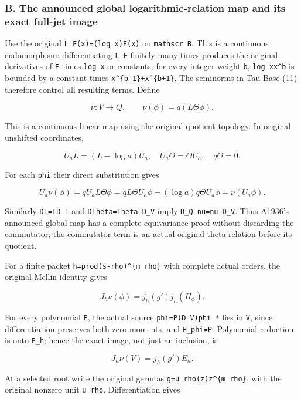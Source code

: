 \subsubsection{B. The announced global logarithmic-relation map and its
exact full-jet
image}\label{b.-the-announced-global-logarithmic-relation-map-and-its-exact-full-jet-image}

Use the original \texttt{L\ F(x)=(log\ x)F(x)} on \texttt{mathscr\ B}.
This is a continuous endomorphism: differentiating \texttt{L\ F}
finitely many times produces the original derivatives of \texttt{F}
times \texttt{log\ x} or constants; for every integer weight \texttt{b},
\texttt{\textbar{}log\ x\textbar{}x\^{}b} is bounded by a constant times
\texttt{x\^{}\{b-1\}+x\^{}\{b+1\}}. The seminorms in Tau Base (11)
therefore control all resulting terms. Define

\[
\nu:V\longrightarrow Q,\qquad \nu(\phi)=q(L\Theta\phi).
\]

This is a continuous linear map using the original quotient topology. In
original unshifted coordinates,

\[
U_aL=(L-\log a)U_a,\quad U_a\Theta=\Theta U_a,\quad q\Theta=0.
\]

For each \texttt{phi} their direct substitution gives

\[
U_a\nu(\phi)=qU_aL\Theta\phi
=qL\Theta U_a\phi-(\log a)q\Theta U_a\phi
=\nu(U_a\phi).
\]

Similarly \texttt{DL=LD-1} and \texttt{DTheta=Theta\ D\_V} imply
\texttt{D\_Q\ nu=nu\ D\_V}. Thus A1936's announced global map has a
complete equivariance proof without discarding the commutator; the
commutator term is an actual original theta relation before its
quotient.

For a finite packet \texttt{h=prod(s-rho)\^{}\{m\_rho\}} with complete
actual orders, the original Mellin identity gives

\[
J_h\nu(\phi)=j_h(g')j_h(H_\phi).
\]

For every polynomial \texttt{P}, the actual source
\texttt{phi=P(D\_V)phi\_*} lies in \texttt{V}, since differentiation
preserves both zero moments, and \texttt{H\_phi=P}. Polynomial reduction
is onto \texttt{E\_h}; hence the exact image, not just an inclusion, is

\[
\boxed{J_h\nu(V)=j_h(g')E_h.}
\]

At a selected root write the original germ as
\texttt{g=u\_rho(z)z\^{}\{m\_rho\}}, with the original nonzero unit
\texttt{u\_rho}. Differentiation gives

